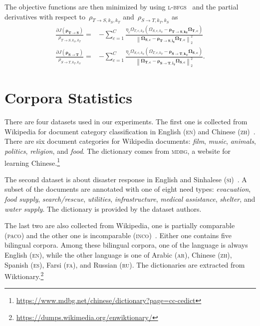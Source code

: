 \documentclass[paper=a4, fontsize=11pt]{article}
\newcommand{\paco}{\textsc{paco}\xspace}
\newcommand{\inco}{\textsc{inco}\xspace}
\newcommand{\en}{\textsc{en}\xspace}
\newcommand{\ar}{\textsc{ar}\xspace}
\newcommand{\zh}{\textsc{zh}\xspace}
\newcommand{\es}{\textsc{es}\xspace}
\newcommand{\fa}{\textsc{fa}\xspace}
\newcommand{\ru}{\textsc{ru}\xspace}
\newcommand{\si}{\textsc{si}\xspace}
\newcommand{\lbfgs}{\textsc{l-bfgs}\xspace}
\begin{document}
The objective functions are then minimized by using \lbfgs~\cite{liu-1989-lbfgs} and the partial derivatives with respect to~$\rho_{T \rightarrow S, k_S, k_T}$ and~$\rho_{S \rightarrow T, k_T, k_S}$ as
\begin{align}
\frac{\partial J(\bm{\rho_{T \rightarrow S}})}{\rho_{T \rightarrow S,k_S,k_T}} =& - \sum_{c=1}^{C} \frac {\eta_c \Omega_{T,c,k_T} \left( \Omega_{S,c,k_S} - \bm{\rho_{T \rightarrow S, k_S}} \bm{\Omega_{T,c}} \right)} {\left\lVert \bm{\Omega_{S,c}} - \bm{\rho_{T \rightarrow S, i_S}} \bm{\Omega_{T,c}} \right\rVert_{2}^2} \\
\frac{\partial J(\bm{\rho_{S \rightarrow T}})}{\rho_{S \rightarrow T,k_T,k_S}} =& - \sum_{c=1}^{C} \frac {\eta_c \Omega_{S,c,k_S} \left( \Omega_{T,c,k_T} - \bm{\rho_{S \rightarrow T, k_T}} \bm{\Omega_{S,c}} \right)} {\left\lVert \bm{\Omega_{T,c}} - \bm{\rho_{S \rightarrow T, i_T}} \bm{\Omega_{S,c}} \right\rVert_{2}^2}.
\end{align}

\section{Corpora Statistics}

There are four datasets used in our experiments. The first one is collected from Wikipedia for document category classification in English (\en) and Chinese (\zh)~\cite{yuan-2018-mtanchor}. There are six document categories for Wikipedia documents: \emph{film}, \emph{music}, \emph{animals}, \emph{politics}, \emph{religion}, and \emph{food}. The dictionary comes from \textsc{mdbg}, a website for learning Chinese.\footnote{\url{https://www.mdbg.net/chinese/dictionary?page=cc-cedict}}

The second dataset is about disaster response in English and Sinhalese (\si)~\cite{strassel-2016-lorelei,strassel-2017-sf}. A subset of the documents are annotated with one of eight need types: \emph{evacuation}, \emph{food supply}, \emph{search/rescue}, \emph{utilities}, \emph{infrastructure}, \emph{medical assistance}, \emph{shelter}, and \emph{water supply}. The dictionary is provided by the dataset authors.

The last two are also collected from Wikipedia, one is partially comparable (\paco) and the other one is incomparable (\inco)~\cite{hao-2018-mtm-doc-link}. Either one contains five bilingual corpora. Among these bilingual corpora, one of the language is always English (\en), while the other language is one of Arabic (\ar), Chinese (\zh), Spanish (\es), Farsi (\fa), and Russian (\ru). The dictionaries are extracted from Wiktionary.\footnote{\url{https://dumps.wikimedia.org/enwiktionary/}}
\end{document}
